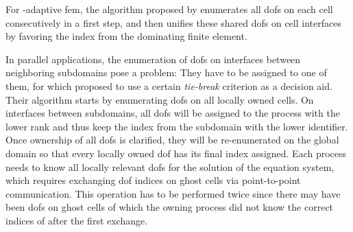 For \hp-adaptive \gls{fem}, the algorithm proposed by \textcite[Sec.~4.2]{bangerth2009} enumerates all \glspl{dof} on each cell consecutively in a first step, and then unifies these shared \glspl{dof} on cell interfaces by favoring the index from the dominating finite element.





In parallel applications, the enumeration of \glspl{dof} on interfaces between neighboring subdomains pose a problem: They have to be assigned to one of them, for which \textcite[Sec.~3.1]{bangerth2012} proposed to use a certain \textit{tie-break} criterion as a decision aid. Their algorithm starts by enumerating \glspl{dof} on all locally owned cells. On interfaces between subdomains, all \glspl{dof} will be assigned to the process with the lower rank and thus keep the index from the subdomain with the lower identifier. Once ownership of all \glspl{dof} is clarified, they will be re-enumerated on the global domain so that every locally owned \gls{dof} has its final index assigned. Each process needs to know all locally relevant \glspl{dof} for the solution of the equation system, which requires exchanging \gls{dof} indices on ghost cells via point-to-point communication. This operation has to be performed twice since there may have been \glspl{dof} on ghost cells of which the owning process did not know the correct indices of after the first exchange.


